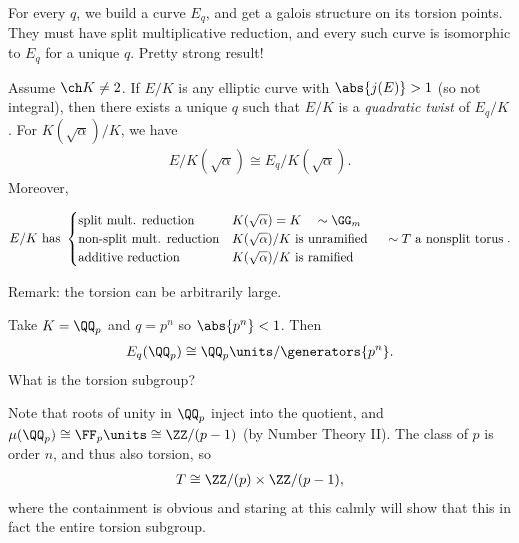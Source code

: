 For every \(q\), we build a curve \(E_q\), and get a galois structure on
its torsion points. They must have split multiplicative reduction, and
every such curve is isomorphic to \(E_q\) for a unique \(q\). Pretty
strong result!

\begin{description}
\tightlist
\item[Theorem (Tate, Part E)]
Assume \(\ch K \neq 2\). If \(E/K\) is any elliptic curve with
\(\abs{j(E)} > 1\) (so not integral), then there exists a unique \(q\)
such that \(E/K\) is a \emph{quadratic twist} of \(E_q/ K\). For
\(K(\sqrt \alpha) / K\), we have
\begin{align*}
  E/K(\sqrt \alpha) \cong E_q / K(\sqrt \alpha)
  .\end{align*} Moreover,
\end{description}

\begin{align*}
  E/K \text{ has } 
  \begin{cases}
  \text{split mult. reduction} & K(\sqrt \alpha) = K \quad \sim \GG_m\\
  \text{non-split mult. reduction} & K(\sqrt \alpha)/K \text{ is unramified } \quad\sim T\text{ a nonsplit torus} \\
  \text{additive reduction} & K(\sqrt \alpha) / K \text{ is ramified }
  \end{cases}
  .\end{align*}

Remark: the torsion can be arbitrarily large.

\begin{description}
\tightlist
\item[Example]
Take \(K = \QQ_p\) and \(q = p^n\) so \(\abs{p^n} < 1\). Then
\begin{align*}
  E_q(\QQ_p) \cong \QQ_p\units / \generators{p^n}
  .\end{align*} What is the torsion subgroup?
\end{description}

Note that roots of unity in \(\QQ_p\) inject into the quotient, and
\(\mu(\QQ_p) \cong \FF_p\units \cong \ZZ/(p-1)\) (by Number Theory II).
The class of \(p\) is order \(n\), and thus also torsion, so
\begin{align*}
  T \cong \ZZ/(p) \times \ZZ/(p-1)
  ,\end{align*} where the containment is obvious and staring at this
calmly will show that this in fact the entire torsion subgroup.

